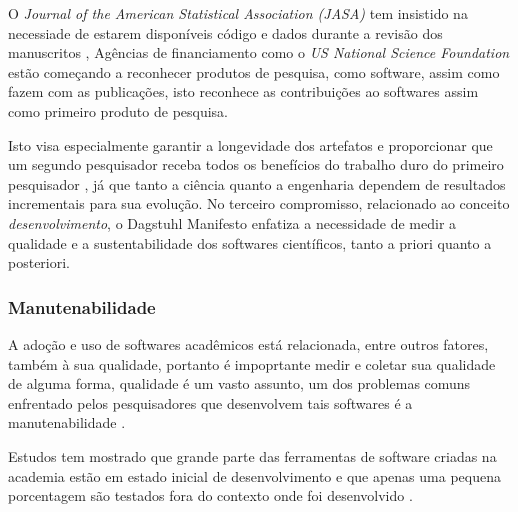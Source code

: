 O {\it Journal of the American Statistical Association (JASA)} tem insistido na
necessiade de estarem disponíveis código e dados durante a revisão dos
manuscritos \cite{baker2016scientists}, Agências de financiamento como o {\it
US National Science Foundation} estão começando a reconhecer produtos de
pesquisa, como software, assim como fazem com as publicações, isto reconhece as
contribuições ao softwares assim como primeiro produto de pesquisa.

Isto visa especialmente garantir a longevidade dos artefatos e proporcionar que
um segundo pesquisador receba todos os benefícios do trabalho duro do primeiro
pesquisador \cite{king1995replication}, já que tanto a ciência quanto a
engenharia dependem de resultados incrementais para sua evolução. No terceiro
compromisso, relacionado ao conceito {\it desenvolvimento}, o Dagstuhl
Manifesto enfatiza a necessidade de medir a qualidade e a sustentabilidade dos
softwares científicos, tanto a priori quanto a posteriori.

\subsubsection{Manutenabilidade}


A adoção e uso de softwares acadêmicos está relacionada, entre outros fatores,
também à sua qualidade, portanto é impoprtante medir e coletar sua qualidade de
alguma forma, qualidade é um vasto assunto, um dos problemas comuns enfrentado
pelos pesquisadores que desenvolvem tais softwares é a manutenabilidade
\cite{Prlic2012}.

Estudos tem mostrado que grande parte das ferramentas de software criadas na
academia estão em estado inicial de desenvolvimento \cite{marshall2013tools} e
que apenas uma pequena porcentagem são testados fora do contexto onde foi
desenvolvido \cite{Portillo12}.




